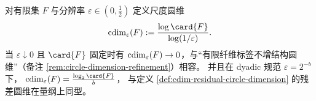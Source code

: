 \begin{remark}\label{rem:cdim-scale-dimension-finite-labels}
对有限集 \(F\) 与分辨率 \(\varepsilon\in(0,\tfrac12)\) 定义尺度圆维
\[
\cdim_\varepsilon(F):=\frac{\log\card{F}}{\log(1/\varepsilon)}.
\]
当 \(\varepsilon\downarrow0\) 且 \(\card{F}\) 固定时有 \(\operatorname{cdim}_\varepsilon(F)\to 0\)，与“有限纤维标签不增结构圆维”（备注 \ref{rem:circle-dimension-refinement}）相容。
并且在 dyadic 规范 \(\varepsilon=2^{-b}\) 下，
\(
\cdim_\varepsilon(F)=\frac{\log_2\card{F}}{b}
\)，
与定义 \ref{def:cdim-residual-circle-dimension} 的残差圆维在量纲上同型。
\end{remark}

\endinput
